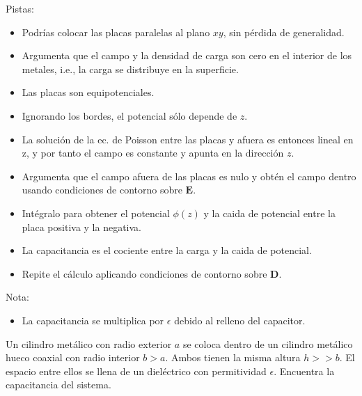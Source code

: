 \documentclass{exam}
\begin{document}
\begin{questions}
  Pistas:
  \begin{itemize}
  \item Podrías colocar las placas paralelas al plano $xy$, sin pérdida de
    generalidad.
  \item Argumenta que el campo y la densidad de carga son cero en el
    interior de los metales, i.e., la carga se distribuye en la superficie.
  \item Las placas son equipotenciales.
  \item Ignorando los bordes, el potencial sólo depende de $z$.
  \item La solución de la ec. de Poisson entre las placas y afuera es
    entonces lineal en z, y por tanto el campo es constante y apunta
    en la dirección $z$.
  \item Argumenta que el campo afuera de las placas es nulo y obtén el
    campo dentro usando condiciones de contorno sobre $\bm E$.
  \item Intégralo para obtener el potencial $\phi(z)$ y la caida de
    potencial entre la placa positiva y la negativa.
  \item La capacitancia es el cociente entre la carga y la caida de
    potencial.
  \item Repite el cálculo aplicando condiciones de contorno sobre $\bm
    D$.
  \end{itemize}
  Nota:
  \begin{itemize}
  \item La capacitancia se multiplica por $\epsilon$ debido al relleno
    del capacitor.
  \end{itemize}
  \question Un cilindro metálico con radio exterior $a$ se coloca
  dentro de un cilindro metálico hueco coaxial con radio interior $b>a$. Ambos
  tienen la misma altura $h>>b$. El espacio entre ellos se llena de un
  dieléctrico con permitividad $\epsilon$. Encuentra la capacitancia del
  sistema.


\end{questions}
\end{document}

